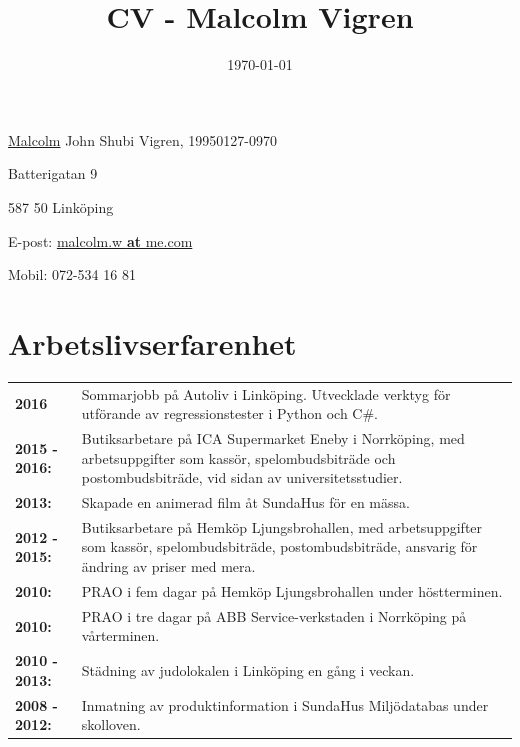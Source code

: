 \documentclass[a4paper,notitlepage]{article}
\title{
\huge{CV - Malcolm Vigren}\vspace{-3ex}}
\date{\today}
\begin{document}
	\maketitle
\underline{Malcolm} John Shubi Vigren, 19950127-0970

Batterigatan 9

587 50 Linköping

E-post: \underline{malcolm.w \textbf{at} me.com}

Mobil: 072-534 16 81

\section*{Arbetslivserfarenhet}
\noindent\begin{tabular}{@{}l p{13cm}}

\textbf{2016} & Sommarjobb på Autoliv i Linköping. Utvecklade verktyg för
    utförande av regressionstester i Python och C\#.\\

\textbf{2015 - 2016:} & Butiksarbetare på ICA Supermarket Eneby i Norrköping, med
arbetsuppgifter som kassör, spelombudsbiträde och postombudsbiträde, vid sidan
av universitetsstudier. \\

\textbf{2013:} & Skapade en animerad film åt SundaHus för en mässa.
\\

\textbf{2012 - 2015:} & Butiksarbetare på Hemköp Ljungsbrohallen,
med arbetsuppgifter
som kassör,
spelombudsbiträde, postombudsbiträde, ansvarig för ändring av priser med mera.
\\

\textbf{2010:} & PRAO i fem dagar på Hemköp Ljungsbrohallen under
höstterminen. \\

\textbf{2010:} & PRAO i tre dagar på ABB Service-verkstaden i
Norrköping på vårterminen. \\

\textbf{2010 - 2013:} & Städning av judolokalen i Linköping en gång
i veckan. \\

\textbf{2008 - 2012:} & Inmatning av produktinformation i SundaHus Miljödatabas under
skolloven.	\\

	\end{tabular}
\end{document}
